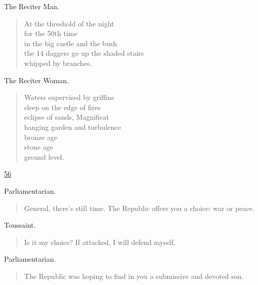 \documentclass[letterpaper,article,12pt,oneside,notitlepage]{memoir}
\begin{document}
\begin{center}The Reciter Man.\end{center}

\begin{verse}
At the threshold of the night \\
for the 50th time \\
in the big castle and the bush \\
the 14 daggers go up the shaded stairs \\
whipped by branches. \\
\end{verse}

\begin{center}The Reciter Woman.\end{center}

\begin{verse}
Waters supervised by griffins \\
sleep on the edge of fires \\
eclipse of sands, Magnificat \\
hanging garden and turbulence \\
bronze age \\
stone age \\
ground level. \\
\end{verse}

\clearpage

\href{http://cesaire.elotroalex.com/chiens/chiens/p056.html}{56}

\begin{center}Parliamentarian.\end{center}

\begin{verse}
General, there's still time. The Republic offers you a choice: war or peace. \\
\end{verse}

\begin{center}Toussaint.\end{center}

\begin{verse}
Is it my choice? If attacked, I will defend myself. \\
\end{verse}

\begin{center}Parliamentarian.\end{center}

\begin{verse}
The Republic was hoping to find in you a submissive and devoted son. \\
\end{verse}
\end{document}
